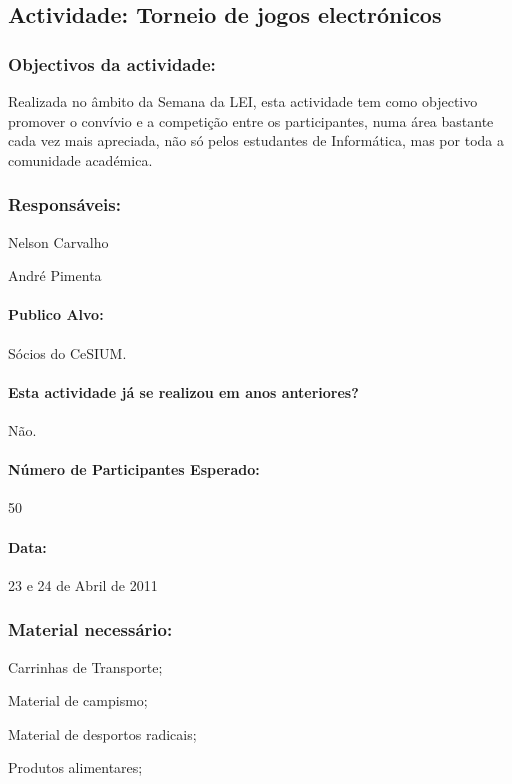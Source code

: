 \subsection{Actividade: Torneio de jogos electrónicos} 

\subsubsection*{Objectivos da actividade:}
Realizada no âmbito da Semana da LEI, esta actividade tem como objectivo promover o convívio e a competição entre os participantes, numa área bastante cada vez mais apreciada, não só pelos estudantes de Informática, mas por toda a comunidade académica.

\subsubsection*{Responsáveis:}
\begin{itemizedash}
	\item{Nelson Carvalho}
	\item{André Pimenta}
\end{itemizedash}

\paragraph{Publico Alvo: }
Sócios do CeSIUM.

\paragraph{Esta actividade já se realizou em anos anteriores?}
Não.

\paragraph{Número de Participantes Esperado:}
50

\paragraph{Data:} 23 e 24 de Abril de 2011

\subsubsection*{Material necessário:}
\begin{itemizedash}
	\item{Carrinhas de Transporte;}
	\item{Material de campismo;}
	\item{Material de desportos radicais;}
	\item{Produtos alimentares;}
\end{itemizedash}

